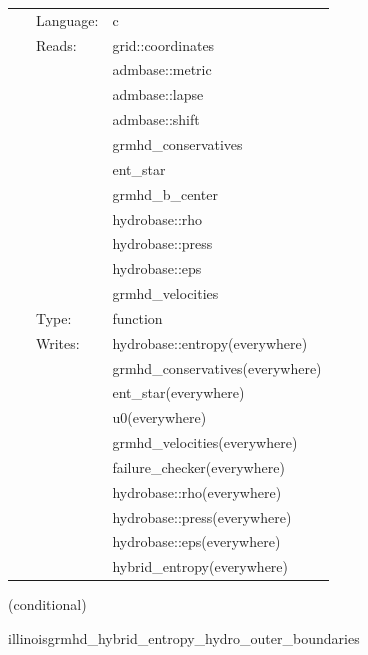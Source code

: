  \begin{tabular*}{160mm}{cll} 
~ & Language:  & c \\ 
~ & Reads:  & grid::coordinates \\ 
~& ~ &admbase::metric\\ 
~& ~ &admbase::lapse\\ 
~& ~ &admbase::shift\\ 
~& ~ &grmhd\_conservatives\\ 
~& ~ &ent\_star\\ 
~& ~ &grmhd\_b\_center\\ 
~& ~ &hydrobase::rho\\ 
~& ~ &hydrobase::press\\ 
~& ~ &hydrobase::eps\\ 
~& ~ &grmhd\_velocities\\ 
~ & Type:  & function \\ 
~ & Writes:  & hydrobase::entropy(everywhere) \\ 
~& ~ &grmhd\_conservatives(everywhere)\\ 
~& ~ &ent\_star(everywhere)\\ 
~& ~ &u0(everywhere)\\ 
~& ~ &grmhd\_velocities(everywhere)\\ 
~& ~ &failure\_checker(everywhere)\\ 
~& ~ &hydrobase::rho(everywhere)\\ 
~& ~ &hydrobase::press(everywhere)\\ 
~& ~ &hydrobase::eps(everywhere)\\ 
~& ~ &hybrid\_entropy(everywhere)\\ 
\end{tabular*} 


\vspace{5mm}

   (conditional) 

\hspace{5mm} illinoisgrmhd\_hybrid\_entropy\_hydro\_outer\_boundaries 

\hspace{5mm}{\it entropy+hybrid version of illinoisgrmhd\_hydro\_outer\_boundaries } 


\hspace{5mm}

